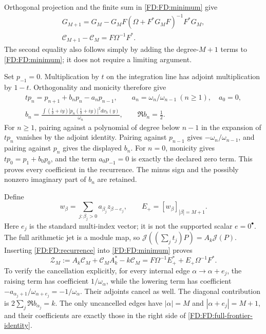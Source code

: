 Orthogonal projection and the finite sum in \eqref{FD:FD:minimum} give
\begin{equation}
\begin{gathered}
G_{M+1}=G_M-G_MF(\Omega+F^*G_MF)^{-1}F^*G_M,\\
\mathcal C_{M+1}-\mathcal C_M=F\Omega^{-1}F^*.
\end{gathered}
\tag{FD.15}\label{FD:FD:full-update}
\end{equation}
The second equality also follows simply by adding the degree-\(M+1\)
terms to \eqref{FD:FD:minimum}; it does not require a limiting argument.

Set \(p_{-1}=0\).  Multiplication by \(t\) on the integration line has adjoint multiplication
by \(1-t\).  Orthogonality and monicity therefore give
\begin{equation}
\begin{gathered}
tp_n=p_{n+1}+b_np_n-a_np_{n-1},\qquad
a_n=\omega_n/\omega_{n-1}\ (n\ge1),\quad a_0=0,\\
b_n=\frac{\int(\tfrac12+iy)|p_n(\tfrac12+iy)|^2d\nu_h(y)}{\omega_n},
\qquad \Re b_n=\tfrac12.
\end{gathered}
\tag{FD.16}\label{FD:FD:recurrence}
\end{equation}
For \(n\ge1\), pairing against a polynomial of degree below \(n-1\)
in the expansion of \(tp_n\)
vanishes by the adjoint identity.  Pairing against \(p_{n-1}\) gives
\(-\omega_n/\omega_{n-1}\), and pairing against \(p_n\) gives the
displayed \(b_n\).  For \(n=0\), monicity gives
\(tp_0=p_1+b_0p_0\), and the term \(a_0p_{-1}=0\) is exactly the
declared zero term.  This proves every coefficient in the recurrence.
The minus sign and the possibly nonzero imaginary part of \(b_n\) are
retained.

Define
\begin{equation}
w_\beta=\sum_{j:\beta_j>0}a_{\beta_j}z_{\beta-e_j},\qquad
E_+=[w_\beta]_{|\beta|=M+1}.
\tag{FD.17}\label{FD:FD:lowering-jets}
\end{equation}
Here \(e_j\) is the standard multi-index vector; it is not the supported
scalar \(e=0^\bullet\).  The full arithmetic jet is a module map, so
\(\mathcal J((\sum_jt_j)P)=A_k\mathcal J(P)\).  Inserting
\eqref{FD:FD:recurrence} into \eqref{FD:FD:minimum} proves
\begin{equation}
\mathcal Z_M:=A_k\mathcal C_M+\mathcal C_MA_k^*-k\mathcal C_M
=F\Omega^{-1}E_+^*+E_+\Omega^{-1}F^*.
\tag{FD.18}\label{FD:FD:full-frontier-identity}
\end{equation}
To verify the cancellation explicitly, for every internal edge
\(\alpha\to\alpha+e_j\), the raising term has coefficient
\(1/\omega_\alpha\), while the lowering term has coefficient
\(-a_{\alpha_j+1}/\omega_{\alpha+e_j}=-1/\omega_\alpha\).
Their adjoints cancel as well.  The diagonal contribution is
\(2\sum_j\Re b_{\alpha_j}=k\).  The only uncancelled edges have
\(|\alpha|=M\) and \(|\alpha+e_j|=M+1\), and their coefficients are
exactly those in the right side of \eqref{FD:FD:full-frontier-identity}.

